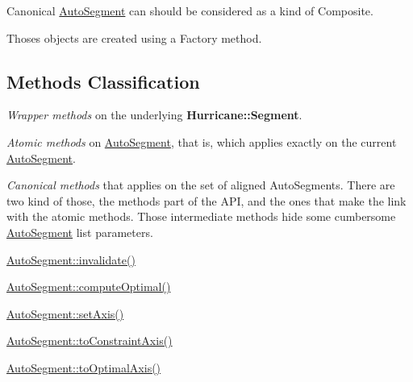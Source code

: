 Canonical \hyperlink{classKatabatic_1_1AutoSegment}{Auto\+Segment} can should be considered as a kind of Composite.

Thoses objects are created using a Factory method.\hypertarget{classKatabatic_1_1AutoSegment_secASMethodsClassif}{}\subsection{Methods Classification}\label{classKatabatic_1_1AutoSegment_secASMethodsClassif}

\begin{DoxyItemize}
\item {\itshape Wrapper methods} on the underlying \textbf{ Hurricane\+::\+Segment}. 
\end{DoxyItemize}
\begin{DoxyItemize}
\item {\itshape Atomic methods} on \hyperlink{classKatabatic_1_1AutoSegment}{Auto\+Segment}, that is, which applies exactly on the current \hyperlink{classKatabatic_1_1AutoSegment}{Auto\+Segment}. 
\end{DoxyItemize}
\begin{DoxyItemize}
\item {\itshape Canonical methods} that applies on the set of aligned Auto\+Segments. There are two kind of those, the methods part of the A\+PI, and the ones that make the link with the atomic methods. Those intermediate methods hide some cumbersome \hyperlink{classKatabatic_1_1AutoSegment}{Auto\+Segment} list parameters. 
\begin{DoxyItemize}
\item \hyperlink{classKatabatic_1_1AutoSegment_a23599eee5a07af377fbc8d47cda7e7b0}{Auto\+Segment\+::invalidate()} 
\item \hyperlink{classKatabatic_1_1AutoSegment_aa902247a1e967e52cc3ab087cd52b366}{Auto\+Segment\+::compute\+Optimal()} 
\item \hyperlink{classKatabatic_1_1AutoSegment_a3881efebb7510d9b22e5f89bcd418954}{Auto\+Segment\+::set\+Axis()} 
\item \hyperlink{classKatabatic_1_1AutoSegment_a8ab41a962e18810808f4f065863b5a73}{Auto\+Segment\+::to\+Constraint\+Axis()} 
\item \hyperlink{classKatabatic_1_1AutoSegment_a750983d7154c94b54537127a3a18e14b}{Auto\+Segment\+::to\+Optimal\+Axis()} 
\end{DoxyItemize}
\end{DoxyItemize}
